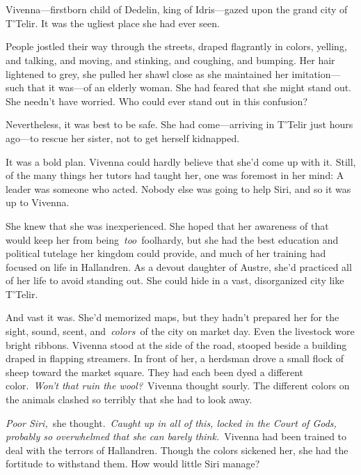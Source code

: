 \chapter{}

Vivenna—firstborn child of Dedelin, king of Idris—gazed upon the grand city of T’Telir. It was the ugliest place she had ever seen.

People jostled their way through the streets, draped flagrantly in colors, yelling, and talking, and moving, and stinking, and coughing, and bumping. Her hair lightened to grey, she pulled her shawl close as she maintained her imitation—such that it was—of an elderly woman. She had feared that she might stand out. She needn’t have worried. Who could ever stand out in this confusion?

Nevertheless, it was best to be safe. She had come—arriving in T’Telir just hours ago—to rescue her sister, not to get herself kidnapped.

It was a bold plan. Vivenna could hardly believe that she’d come up with it. Still, of the many things her tutors had taught her, one was foremost in her mind: A leader was someone who acted. Nobody else was going to help Siri, and so it was up to Vivenna.

She knew that she was inexperienced. She hoped that her awareness of that would keep her from being~\textit{too}~foolhardy, but she had the best education and political tutelage her kingdom could provide, and much of her training had focused on life in Hallandren. As a devout daughter of Austre, she’d practiced all of her life to avoid standing out. She could hide in a vast, disorganized city like T’Telir.

And vast it was. She’d memorized maps, but they hadn’t prepared her for the sight, sound, scent, and~\textit{colors}~of the city on market day. Even the livestock wore bright ribbons. Vivenna stood at the side of the road, stooped beside a building draped in flapping streamers. In front of her, a herdsman drove a small flock of sheep toward the market square. They had each been dyed a different color.~\textit{Won’t that ruin the wool?}~Vivenna thought sourly. The different colors on the animals clashed so terribly that she had to look away.

\textit{Poor Siri,}~she thought.~\textit{Caught up in all of this, locked in the Court of Gods, probably so overwhelmed that she can barely think.}~Vivenna had been trained to deal with the terrors of Hallandren. Though the colors sickened her, she had the fortitude to withstand them. How would little Siri manage?

